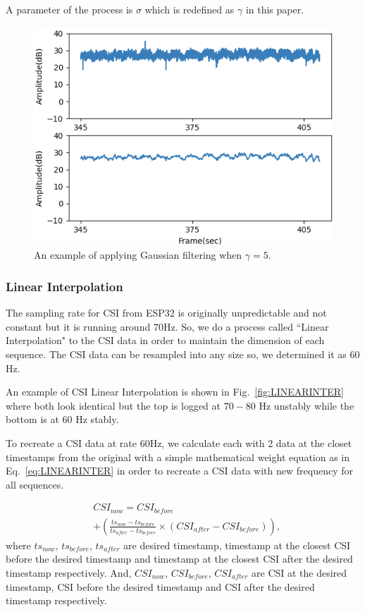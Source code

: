 \documentclass[10pt,letterpaper]{article}
\begin{document}
	A parameter of the process is $\sigma$ which is redefined as $\gamma$ in this paper.
	
	
	\begin{figure}[htbp]
		\centerline{\includegraphics[width=120mm,scale=0.9]{FILPD_H2G.png}}
		\caption{An example of applying Gaussian filtering when $\gamma=5$.}
		\label{fig:GAUSSIAN}
	\end{figure}


	\subsubsection*{Linear Interpolation}
	
	The sampling rate for CSI from ESP32 is originally unpredictable and not constant but it is running around 70Hz. So, we do a process called ``Linear Interpolation" to the CSI data in order to maintain the dimension of each sequence. The CSI data can be resampled into any size so, we determined it as 60 Hz.
	
	An example of CSI Linear Interpolation is shown in Fig.~\ref{fig:LINEARINTER} where both look identical but the top is logged at $70-80$ Hz unstably while the bottom is at $60$ Hz stably.
	
To recreate a CSI data at rate 60Hz, we calculate each with 2 data at the closet timestamps from the original with a simple mathematical weight equation as in Eq.~\ref{eq:LINEARINTER} in order to recreate a CSI data with new frequency for all sequences.
	
	\begin{equation}
		\begin{aligned}
			& CSI_{now} = CSI_{before} \\ 
			& + \left(  \frac{ts_{now}-ts_{before}}{ts_{after}-ts_{before}}  \times (CSI_{after}-CSI_{before})   \right),
			\label{eq:LINEARINTER}
		\end{aligned}
	\end{equation}
	where $ts_{now}$, $ts_{before}$, $ts_{after}$ are desired timestamp, timestamp at the closest CSI before the desired timestamp and timestamp at the closest CSI after the desired timestamp respectively. And, $CSI_{now}$, $CSI_{before}$, $CSI_{after}$ are CSI at the desired timestamp, CSI before the desired timestamp and CSI after the desired timestamp respectively.
	
\end{document}
